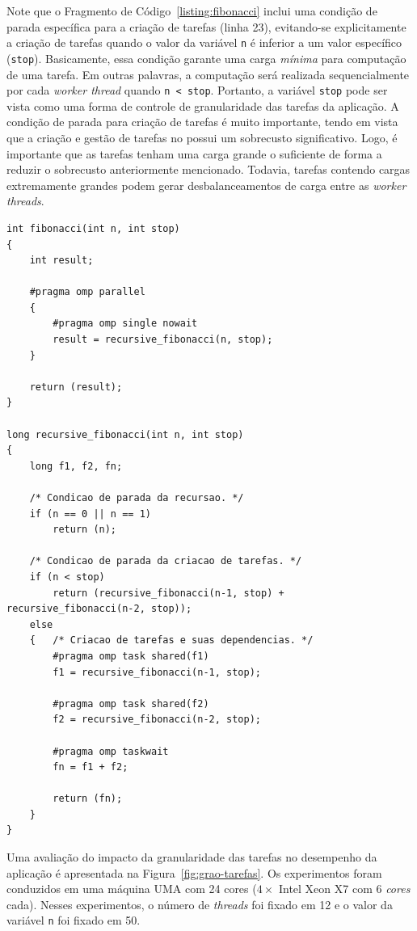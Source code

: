 \documentclass{SBCbookchapter}
\begin{document}
	Note que o Fragmento de Código~\ref{listing:fibonacci} inclui uma condição de parada específica para a criação de tarefas (linha 23),
	evitando-se explicitamente a criação de tarefas quando o valor da variável \texttt{n} é inferior a um valor específico (\texttt{stop}). 
	Basicamente, essa condição garante uma carga \textit{mínima} para computação de uma tarefa. Em outras palavras, a
	computação será realizada sequencialmente por cada \textit{worker thread} quando \texttt{n < stop}. Portanto,
	a variável \texttt{stop} pode ser vista como uma forma de controle de granularidade das tarefas da aplicação.
	A condição de parada para criação de tarefas é muito importante, tendo em vista que a criação e gestão de tarefas no
	\openmp possui um sobrecusto significativo. Logo, é importante que as tarefas tenham uma carga grande o suficiente de forma
	a reduzir o sobrecusto anteriormente mencionado. Todavia, tarefas contendo cargas extremamente grandes podem gerar
	desbalanceamentos de carga entre as \textit{worker threads}.

\begin{lstlisting}[frame=single, caption=Exemplo de uma implementação recursiva simples da soma da sequencia de Fibonacci
usando tarefas., label=listing:fibonacci]
int fibonacci(int n, int stop)
{
	int result;
	
	#pragma omp parallel
  	{
		#pragma omp single nowait
		result = recursive_fibonacci(n, stop);
	}
		
	return (result);
}

long recursive_fibonacci(int n, int stop)
{
	long f1, f2, fn;

	/* Condicao de parada da recursao. */
	if (n == 0 || n == 1) 
		return (n);

	/* Condicao de parada da criacao de tarefas. */
	if (n < stop) 
		return (recursive_fibonacci(n-1, stop) + recursive_fibonacci(n-2, stop));
	else
	{	/* Criacao de tarefas e suas dependencias. */
		#pragma omp task shared(f1)
		f1 = recursive_fibonacci(n-1, stop);

		#pragma omp task shared(f2)
		f2 = recursive_fibonacci(n-2, stop);
		
		#pragma omp taskwait
		fn = f1 + f2;
			
		return (fn);
	}
}
\end{lstlisting}

	Uma avaliação do impacto da granularidade das tarefas no desempenho da aplicação é apresentada na
	Figura~\ref{fig:grao-tarefas}. Os experimentos foram conduzidos em uma máquina UMA com 24 cores
	($4 \times$ Intel Xeon X7 com 6 \textit{cores} cada). Nesses experimentos, o número de \textit{threads} foi fixado
	em 12 e o valor da variável \texttt{n} foi fixado em 50.
	
\end{document}
